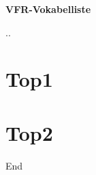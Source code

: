 \documentclass[10pt,a4paper]{article}
\begin{document}
\setlength{\parindent}{0pt}

\begin{center}
\huge
\vspace{1cm}

\textbf{VFR-Vokabelliste}
\normalsize

\vspace{.5cm}
\the\day.\the\month.\the\year
\end{center}

\tableofcontents

\newpage %


\section{Top1}

\newpage
\section{Top2}





\newpage 		%
\hspace{0pt}	%
\vfill			%
\centering		%
End				%
\vfill			%
\hspace{0pt}	%
\end{document}
